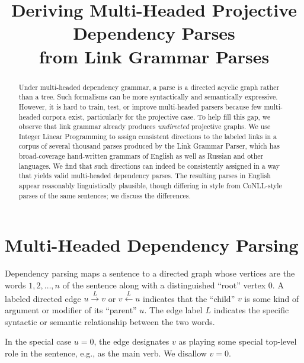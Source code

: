 \documentclass[11pt]{article}
\title{Deriving Multi-Headed Projective Dependency Parses \\ from Link Grammar Parses}
\date{}
\begin{document}
\maketitle

\begin{abstract}
Under multi-headed dependency grammar, a parse is a directed acyclic graph rather than a tree.  Such formalisms can be more syntactically and semantically expressive.  However, 
it is hard to train, test, or improve multi-headed parsers because few multi-headed corpora exist, particularly for the projective case.
To help fill this gap, we observe that link grammar already produces {\em undirected} projective graphs.  
We use Integer Linear Programming to assign consistent directions to the labeled links in a corpus of several thousand parses produced by the Link Grammar Parser, which has broad-coverage hand-written grammars of English as well as Russian and other languages.  We find that such directions can indeed be consistently assigned in a way that yields valid multi-headed dependency parses. The resulting parses in English appear reasonably linguistically plausible, though differing in style from CoNLL-style parses of the same sentences; we discuss the differences.  
\end{abstract}

\section{Multi-Headed Dependency Parsing}

Dependency parsing maps a sentence to a directed graph whose vertices are the words $1, 2, \ldots, n$ of the sentence along with a distinguished ``root'' vertex 0.  A labeled directed edge $u \stackrel{L}{\rightarrow} v$ or $v \stackrel{L}{\leftarrow} u$ indicates that the ``child'' $v$ is some kind of argument or modifier of its ``parent'' $u$.  The edge label $L$ indicates the specific syntactic or semantic relationship between the two words.  

In the special case $u=0$, the edge designates $v$ as playing some special top-level role in the sentence, e.g., as the main verb.  We disallow $v=0$.
\end{document}
